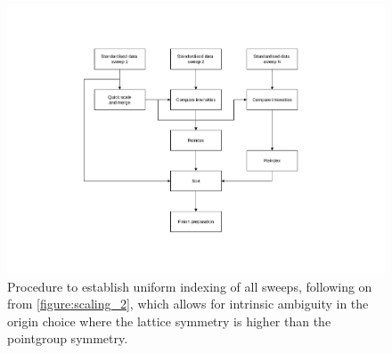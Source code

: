 \documentclass[a4paper, 11pt]{article}
\begin{document}
\begin{figure}
\caption{Procedure to establish uniform indexing of all sweeps,
following on from \ref{figure:scaling_2}, which allows for intrinsic
ambiguity in the origin choice where the lattice symmetry is higher
than the pointgroup symmetry.
\label{figure:scaling_3}}
\centering
\includegraphics[scale=0.5]{figures/scaling-step-3.pdf}
\end{figure}
\end{document}
